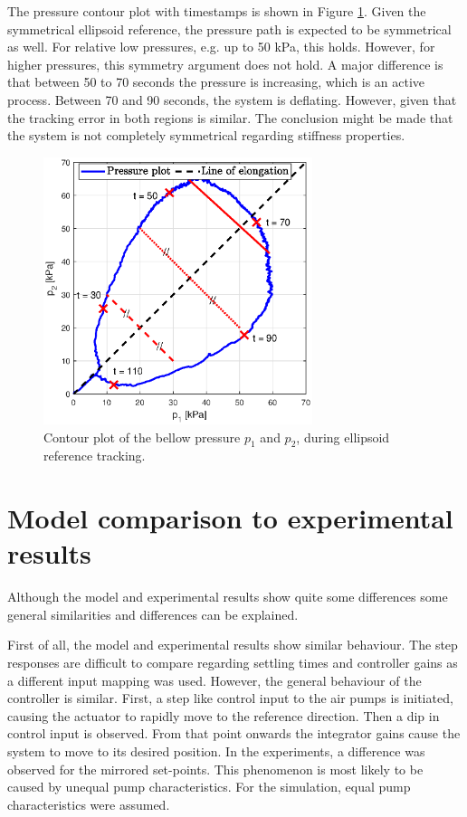 The pressure contour plot with timestamps is shown in Figure \ref{fig5:pressureellips}. Given the symmetrical ellipsoid reference, the pressure path is expected to be symmetrical as well. For relative low pressures, e.g. up to 50 kPa, this holds. However, for higher pressures, this symmetry argument does not hold. A major difference is that between 50 to 70 seconds the pressure is increasing, which is an active process. Between 70 and 90 seconds, the system is deflating. However, given that the tracking error in both regions is similar. The conclusion might be made that the system is not completely symmetrical regarding stiffness properties. 




\begin{figure}[H] 
       \centering
    \includegraphics[width = 0.7\textwidth]{Figures/Chapter5/pcontourellips.eps}
    \caption{Contour plot of the bellow pressure $p_1$ and $p_2$, during ellipsoid reference tracking.}
    \label{fig5:pressureellips}
\end{figure}

 

\section{Model comparison to experimental results}

Although the model and experimental results show quite some differences some general similarities and differences can be explained. 

First of all, the model and experimental results show similar behaviour. The step responses are difficult to compare regarding settling times and controller gains as a different input mapping was used. However, the general behaviour of the controller is similar. First, a step like control input to the air pumps is initiated, causing the actuator to rapidly move to the reference direction. Then a dip in control input is observed. From that point onwards the integrator gains cause the system to move to its desired position. In the experiments, a difference was observed for the mirrored set-points. This phenomenon is most likely to be caused by unequal pump characteristics. For the simulation, equal pump characteristics were assumed. 

